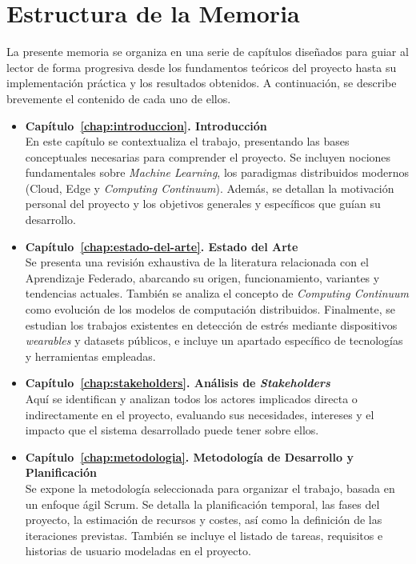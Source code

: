 \documentclass{report}
\begin{document}
\section{Estructura de la Memoria}
La presente memoria se organiza en una serie de capítulos diseñados para guiar al lector de forma progresiva desde los fundamentos teóricos del proyecto hasta su implementación práctica y los resultados obtenidos. A continuación, se describe brevemente el contenido de cada uno de ellos.

\begin{itemize}

    \item \textbf{Capítulo~\ref{chap:introduccion}. Introducción}\\
    En este capítulo se contextualiza el trabajo, presentando las bases conceptuales necesarias para comprender el proyecto. Se incluyen nociones fundamentales sobre \textit{Machine Learning}, los paradigmas distribuidos modernos (Cloud, Edge y \textit{Computing Continuum}). Además, se detallan la motivación personal del proyecto y los objetivos generales y específicos que guían su desarrollo.

    \item \textbf{Capítulo~\ref{chap:estado-del-arte}. Estado del Arte}\\
    Se presenta una revisión exhaustiva de la literatura relacionada con el Aprendizaje Federado, abarcando su origen, funcionamiento, variantes y tendencias actuales. También se analiza el concepto de \textit{Computing Continuum} como evolución de los modelos de computación distribuidos. Finalmente, se estudian los trabajos existentes en detección de estrés mediante dispositivos \textit{wearables} y datasets públicos, e incluye un apartado específico de tecnologías y herramientas empleadas.

    \item \textbf{Capítulo~\ref{chap:stakeholders}. Análisis de \textit{Stakeholders}}\\
    Aquí se identifican y analizan todos los actores implicados directa o indirectamente en el proyecto, evaluando sus necesidades, intereses y el impacto que el sistema desarrollado puede tener sobre ellos.

    \item \textbf{Capítulo~\ref{chap:metodologia}. Metodología de Desarrollo y Planificación}\\
    Se expone la metodología seleccionada para organizar el trabajo, basada en un enfoque ágil Scrum. Se detalla la planificación temporal, las fases del proyecto, la estimación de recursos y costes, así como la definición de las iteraciones previstas. También se incluye el listado de tareas, requisitos e historias de usuario modeladas en el proyecto.


\end{itemize}
\end{document}
